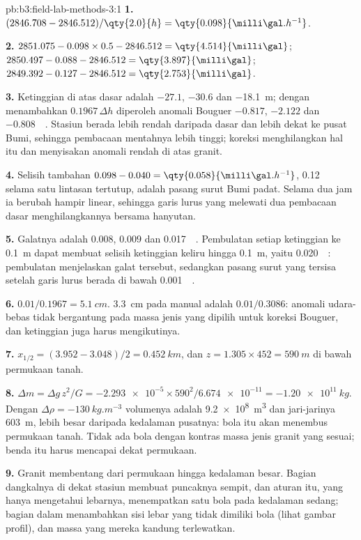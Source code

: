 \begin{solution}{pb:b3:field-lab-methods-3:1}
\textbf{1.} $(2846.708 - 2846.512)/\qty{2.0}{h} = \qty{0.098}{\milli\gal.h^{-1}}$.

\textbf{2.} $2851.075 - 0.098\times0.5 - 2846.512 = \qty{4.514}{\milli\gal}$;
$2850.497 - 0.088 - 2846.512 = \qty{3.897}{\milli\gal}$;
$2849.392 - 0.127 - 2846.512 = \qty{2.753}{\milli\gal}$.

\textbf{3.} Ketinggian di atas dasar adalah $-27.1$, $-30.6$ dan
\qty{-18.1}{m}; dengan menambahkan $0.1967\,\Delta h$ diperoleh anomali Bouguer
$\num{-0.817}$, $\num{-2.122}$ dan \qty{-0.808}{\milli\gal}. Stasiun
berada lebih rendah daripada dasar dan lebih dekat ke pusat Bumi,
sehingga pembacaan mentahnya lebih tinggi; koreksi menghilangkan hal itu dan
menyisakan anomali rendah di atas granit.

\textbf{4.} Selisih tambahan $0.098 - 0.040 = \qty{0.058}{\milli\gal.h^{-1}}$,
\qty{0.12}{\milli\gal} selama satu lintasan tertutup, adalah pasang surut Bumi padat. Selama dua
jam ia berubah hampir linear, sehingga garis lurus yang melewati dua
pembacaan dasar menghilangkannya bersama hanyutan.

\textbf{5.} Galatnya adalah $\num{0.008}$, $\num{0.009}$ dan
\qty{0.017}{\milli\gal}. Pembulatan setiap ketinggian ke \qty{0.1}{m} dapat membuat
selisih ketinggian keliru hingga \qty{0.1}{m}, yaitu
\qty{0.020}{\milli\gal}: pembulatan menjelaskan galat tersebut, sedangkan pasang surut
yang tersisa setelah garis lurus berada di bawah \qty{0.001}{\milli\gal}.

\textbf{6.} $0.01/0.1967 = \qty{5.1}{cm}$. \qty{3.3}{cm} pada manual adalah
$0.01/0.3086$: anomali udara-bebas tidak bergantung pada massa jenis
yang dipilih untuk koreksi Bouguer, dan ketinggian juga harus mengikutinya.

\textbf{7.} $x_{1/2} = (3.952 - 3.048)/2 = \qty{0.452}{km}$, dan $z = 1.305
\times452 = \qty{590}{m}$ di bawah permukaan tanah.

\textbf{8.} $\Delta m = \Delta g\,z^2/G = \num{-2.293e-5}\times590^2/
\num{6.674e-11} = \qty{-1.20e11}{kg}$. Dengan $\Delta\rho =
\qty{-130}{kg.m^{-3}}$ volumenya adalah \qty{9.2e8}{m^3} dan jari-jarinya
\qty{603}{m}, lebih besar daripada kedalaman pusatnya: bola itu akan
menembus permukaan tanah. Tidak ada bola dengan kontras massa jenis granit
yang sesuai; benda itu harus mencapai dekat permukaan.

\textbf{9.} Granit membentang dari permukaan hingga kedalaman besar. Bagian dangkalnya
di dekat stasiun membuat puncaknya sempit, dan aturan itu, yang
hanya mengetahui lebarnya, menempatkan satu bola pada kedalaman sedang; bagian
dalam menambahkan sisi lebar yang tidak dimiliki bola (lihat gambar
profil), dan massa yang mereka kandung terlewatkan.


\end{solution}
